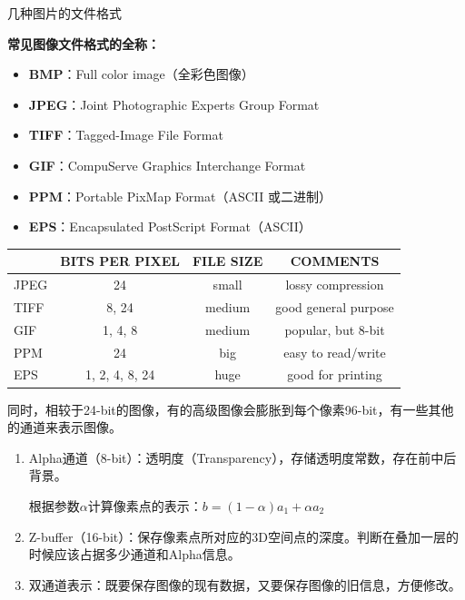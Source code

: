 \begin{fancybox}{几种图片的文件格式}

\textbf{常见图像文件格式的全称：}
\begin{itemize}[leftmargin=1.6em,itemsep=1pt,topsep=3pt,parsep=0pt]
    \item \textbf{BMP}：Full color image（全彩色图像）
    \item \textbf{JPEG}：Joint Photographic Experts Group Format
    \item \textbf{TIFF}：Tagged-Image File Format
    \item \textbf{GIF}：CompuServe Graphics Interchange Format
    \item \textbf{PPM}：Portable PixMap Format（ASCII 或二进制）
    \item \textbf{EPS}：Encapsulated PostScript Format（ASCII）
\end{itemize}

\vspace{2pt}
\begin{center}
\small
\begin{tabular}{lccc}
\toprule
 & \textbf{BITS PER PIXEL} & \textbf{FILE SIZE} & \textbf{COMMENTS} \\
\midrule
JPEG & 24            & small  & lossy compression \\
TIFF & 8, 24         & medium & good general purpose \\
GIF  & 1, 4, 8       & medium & popular, but 8-bit \\
PPM  & 24            & big    & easy to read/write \\
EPS  & 1, 2, 4, 8, 24 & huge  & good for printing \\
\bottomrule
\end{tabular}
\end{center}
\end{fancybox}

同时，相较于24-bit的图像，有的高级图像会膨胀到每个像素96-bit，有一些其他的通道来表示图像。

\begin{enumerate}
    \item Alpha通道（8-bit）：透明度（Transparency），存储透明度常数，存在前中后背景。
    
    根据参数$\alpha$计算像素点的表示：$b = (1-\alpha) a_1 + \alpha a_2$
    \item Z-buffer（16-bit）：保存像素点所对应的3D空间点的深度。判断在叠加一层的时候应该占据多少通道和Alpha信息。
    
    \item 双通道表示：既要保存图像的现有数据，又要保存图像的旧信息，方便修改。
\end{enumerate}

